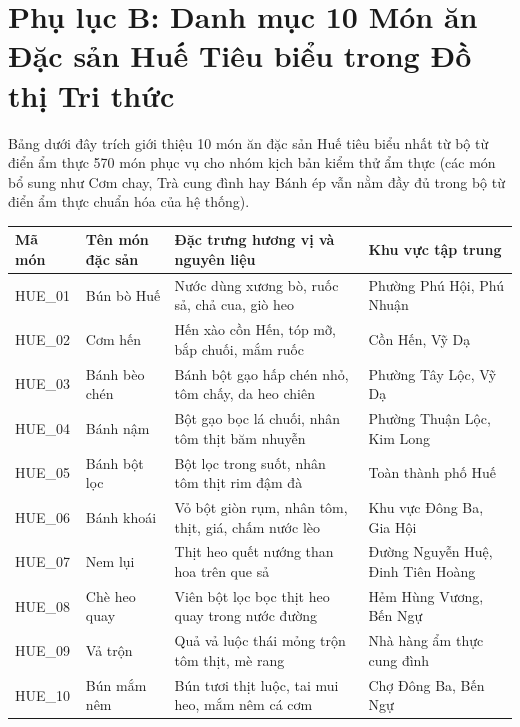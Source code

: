 \vspace{0.8cm}

\section*{Phụ lục B: Danh mục 10 Món ăn Đặc sản Huế Tiêu biểu trong Đồ thị Tri thức}
{}

Bảng dưới đây trích giới thiệu 10 món ăn đặc sản Huế tiêu biểu nhất từ bộ từ điển ẩm thực 570 món phục vụ cho nhóm kịch bản kiểm thử ẩm thực (các món bổ sung như Cơm chay, Trà cung đình hay Bánh ép vẫn nằm đầy đủ trong bộ từ điển ẩm thực chuẩn hóa của hệ thống).

\begingroup
\small
{}
\setlength{\tabcolsep}{4pt}
\noindent
\begin{tabularx}{\textwidth}{|l|l|>{\raggedright\arraybackslash}X|l|}
\hline
\textbf{Mã món} & \textbf{Tên món đặc sản} & \textbf{Đặc trưng hương vị và nguyên liệu} & \textbf{Khu vực tập trung} \\
\hline
HUE\_01 & Bún bò Huế & Nước dùng xương bò, ruốc sả, chả cua, giò heo & Phường Phú Hội, Phú Nhuận \\ \hline
HUE\_02 & Cơm hến & Hến xào cồn Hến, tóp mỡ, bắp chuối, mắm ruốc & Cồn Hến, Vỹ Dạ \\ \hline
HUE\_03 & Bánh bèo chén & Bánh bột gạo hấp chén nhỏ, tôm chấy, da heo chiên & Phường Tây Lộc, Vỹ Dạ \\ \hline
HUE\_04 & Bánh nậm & Bột gạo bọc lá chuối, nhân tôm thịt băm nhuyễn & Phường Thuận Lộc, Kim Long \\ \hline
HUE\_05 & Bánh bột lọc & Bột lọc trong suốt, nhân tôm thịt rim đậm đà & Toàn thành phố Huế \\ \hline
HUE\_06 & Bánh khoái & Vỏ bột giòn rụm, nhân tôm, thịt, giá, chấm nước lèo & Khu vực Đông Ba, Gia Hội \\ \hline
HUE\_07 & Nem lụi & Thịt heo quết nướng than hoa trên que sả & Đường Nguyễn Huệ, Đinh Tiên Hoàng \\ \hline
HUE\_08 & Chè heo quay & Viên bột lọc bọc thịt heo quay trong nước đường & Hẻm Hùng Vương, Bến Ngự \\ \hline
HUE\_09 & Vả trộn & Quả vả luộc thái mỏng trộn tôm thịt, mè rang & Nhà hàng ẩm thực cung đình \\ \hline
HUE\_10 & Bún mắm nêm & Bún tươi thịt luộc, tai mui heo, mắm nêm cá cơm & Chợ Đông Ba, Bến Ngự \\
\hline
\end{tabularx}
\endgroup

